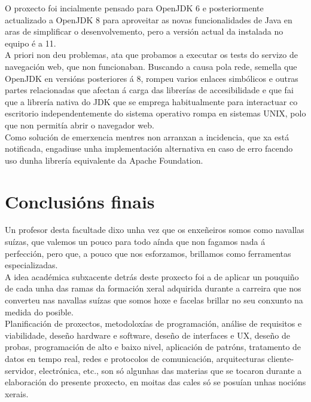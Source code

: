   O proxecto foi incialmente pensado para OpenJDK 6 e posteriormente actualizado
  a OpenJDK 8 para aproveitar as novas funcionalidades de Java en aras de
  simplificar o desenvolvemento, pero a versión actual da instalada no equipo é
  a 11. \\
  
  A priori non deu problemas, ata que probamos a executar os tests do servizo de
  navegación web, que non funcionaban. Buscando a causa pola rede, semella que
  OpenJDK en versións posteriores á 8, rompeu varios enlaces simbólicos e outras
  partes relacionadas que afectan á carga das librerías de accesibilidade e que
  fai que a librería nativa do JDK que se emprega habitualmente para interactuar
  co escritorio independentemente do sistema operativo rompa en sistemas UNIX,
  polo que non permitía abrir o navegador web. \\
  
  Como solución de emerxencia mentres non arranxan a incidencia, que xa está
  notificada, engadiuse unha implementación alternativa en caso de erro facendo
  uso dunha librería equivalente da Apache Foundation.

\section{Conclusións finais}

 Un profesor desta facultade dixo unha vez que os enxeñeiros somos como navallas
 suízas, que valemos un pouco para todo aínda que non fagamos nada á perfección,
 pero que, a pouco que nos esforzamos, brillamos como ferramentas
 especializadas. \\
 
 A idea académica subxacente detrás deste proxecto foi a de aplicar un pouquiño
 de cada unha das ramas da formación xeral adquirida durante a carreira que nos
 converteu nas navallas suízas que somos hoxe e facelas brillar no seu
 conxunto na medida do posible. \\
 
 Planificación de proxectos, metodoloxías de programación, análise de
 requisitos e viabilidade, deseño hardware e software, deseño de interfaces e
 UX, deseño de probas, programación de alto e baixo nivel, aplicación de
 patróns, tratamento de datos en tempo real, redes e protocolos de comunicación,
 arquitecturas cliente-servidor, electrónica, etc., son só algunhas das materias
 que se tocaron durante a elaboración do presente proxecto, en moitas das cales
 só se posuían unhas nocións xerais. \\
 
